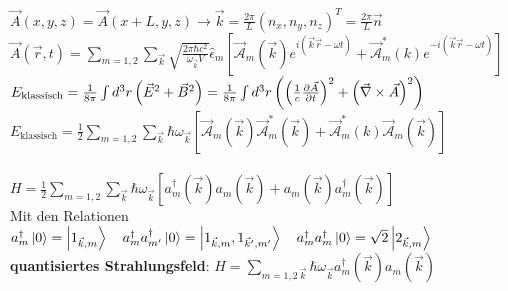 



{\Huge
\(\vec A(x,y,z) = \vec A(x+L,y,z) \rightarrow \vec k = \frac{2\pi}{L}
  (n_x,n_y,n_z)^T
= \frac{2\pi}{L} \vec n \)\\
\( \boxed{\vec A(\vec r, t) =  \sum_{m=1,2} \sum_{\vec k} \sqrt{\frac{2\pi\hbar c^2}{\omega_{\vec k}V}}  \hat \epsilon_m  \left[  \vec{\mathcal A}_m (\vec k)  e^{i(\vec k\vec r-\omega t)} + \vec{\mathcal A}^*_m (k) e^{-i(\vec k\vec r-\omega t)}\right]}\)\\
\( E_{\text{klassisch}} = \frac{1}{8\pi} \int d^3r \left( \vec E^2+\vec B^2 \right) = \frac{1}{8\pi} \int d^3r \left( \left( \frac{1}{c} \pdiff{\vec A}_t \right)^2 + \left(\vec \nabla\times\vec A\right)^2 \right)\)\\
\( E_{\text{klassisch}} = \frac{1}{2} \sum_{m=1,2} \sum_{\vec k} \hbar \omega_{\vec k} \left[ 
 \vec{\mathcal A}_{m} (\vec k)  \vec{\mathcal A}^*_{m} (\vec k)  
+ \vec{\mathcal A}^*_m (k) \vec{\mathcal A}_{m} (\vec k)\right]  \)\\
\\
\( H = \frac{1}{2} \sum_{m=1,2} \sum_{\vec k} \hbar \omega_{\vec k} \left[ a^\dagger_m(\vec k) a_m(\vec k) + a_m(\vec k) a^\dagger_m(\vec k) \right]\)\\
Mit den Relationen\\
\( a^\dagger_{m} \left| 0 \right\rangle = \left| 1_{\vec k,m} \right\rangle \quad a^\dagger_{m}  a^\dagger_{m'} \left| 0 \right\rangle = \left| 1_{\vec k,m},1_{\vec k',m'} \right\rangle \quad  a^\dagger_{m} a^\dagger_{m} \left| 0 \right\rangle = \sqrt{2} \left| 2_{\vec k,m} \right\rangle\)\\
\textbf{quantisiertes Strahlungsfeld}: \( \boxed{H = \sum_{m=1,2\,\vec k}  \hbar \omega_{\vec k} a^\dagger_m(\vec k) a_m(\vec k)} \)
}%

